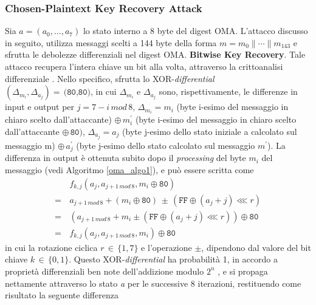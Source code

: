 \subsubsection{Chosen-Plaintext Key Recovery Attack}
Sia $a=\left(a_0,\ldots,a_7\right)$ lo stato interno a 8 byte del digest OMA. L'attacco discusso in seguito, utilizza messaggi scelti a 144 byte della forma $m=m_0 \|\cdots \|m_{143}$ e sfrutta le debolezze differenziali nel digest OMA.
\newline \newline
\textbf{Bitwise Key Recovery}.
Tale attacco recupera l'intera chiave un bit alla volta, attraverso la crittoanalisi differenziale \cite{diffcrypt}. Nello specifico, sfrutta lo XOR-\textit{differential} $\left(\Delta_{m_i}, \Delta_{a_j}\right) =\,\texttt{(80,80)}\text{, in cui }\Delta_{m_i} \text{ e } \Delta_{a_j} $ sono, rispettivamente, le differenze in input e output per $j = 7-i \, mod\, 8 \text{, }\Delta_{m_i} = m_i $ (byte i-esimo del messaggio in chiaro scelto dall'attaccante) $ \oplus \, m^{\prime}_i $ (byte i-esimo del messaggio in chiaro scelto dall'attaccante $\oplus \,  \texttt{80})$, $ \Delta_{a_j} = a_j $ (byte j-esimo dello stato iniziale a calcolato sul messaggio m) $\oplus \, a^\prime_j $ (byte j-esimo dello stato calcolato sul messaggio $m^\prime$). 
\newline La differenza in output è ottenuta subito dopo il \textit{processing} del byte $m_i$ del messaggio (vedi Algoritmo \ref{oma_algo1}), e può essere scritta come
\begin{equation*}
\begin{split}
&f_{k,j}\left(a_j, a_{j+1 \, mod \, 8}, m_i \oplus \texttt{80} \right) \\
=\,&a_{j+1\,mod\,8} + \left( m_i \oplus \texttt{80} \right) \, \pm \, \left(\texttt{FF} \oplus (a_j+j) \lll r \right) \\
=\,&\left(a_{j+1\,mod\,8} + m_i \pm ( \texttt{FF} \oplus (a_j+j) \lll r)\right)\oplus \texttt{80} \\
=\,&f_{k,j}\left(a_j, a_{j+1 \, mod \, 8}, m_i\right) \oplus \texttt{80}
\end{split}
\end{equation*}
in cui la rotazione ciclica $r\,\in \, \{1,7\}$ e l'operazione $\pm$, dipendono dal valore del bit chiave $k \, \in \, \{0,1\}$. Questo XOR-\textit{differential} ha probabilità 1, in accordo a proprietà differenziali ben note dell'addizione modulo $2^n$ \cite{diff}, e si propaga nettamente attraverso lo stato \textit{a} per le successive 8 iterazioni, restituendo come risultato la seguente differenza
